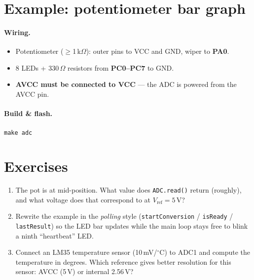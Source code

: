 \documentclass[11pt,a4paper]{article}
\begin{document}
\section{Example: potentiometer bar graph}

\paragraph{Wiring.}
\begin{itemize}
  \item Potentiometer ($\geq$1\,k$\Omega$): outer pins to VCC and GND, wiper to \textbf{PA0}.
  \item 8 LEDs + 330\,$\Omega$ resistors from \textbf{PC0--PC7} to GND.
  \item \textbf{AVCC must be connected to VCC} --- the ADC is powered from the AVCC pin.
\end{itemize}

\paragraph{Build \& flash.} \texttt{make adc}



\section{Exercises}

\begin{enumerate}
  \item The pot is at mid-position. What value does \texttt{ADC.read()}
        return (roughly), and what voltage does that correspond to at
        $V_{\text{ref}} = 5$\,V?
  \item Rewrite the example in the \emph{polling} style
        (\texttt{startConversion} / \texttt{isReady} / \texttt{lastResult})
        so the LED bar updates while the main loop stays free to blink a
        ninth ``heartbeat'' LED.
  \item Connect an LM35 temperature sensor (10\,mV/$^{\circ}$C) to ADC1 and
        compute the temperature in degrees. Which reference gives better
        resolution for this sensor: AVCC (5\,V) or internal 2.56\,V?
\end{enumerate}
\end{document}

